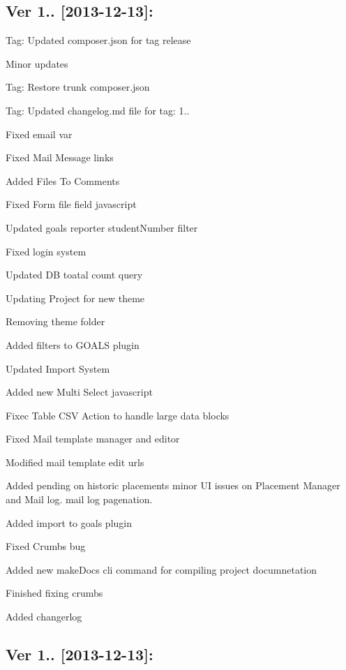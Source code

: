 \subsection*{Ver 1.. \mbox{[}2013-\/12-\/13\mbox{]}\+: }


\begin{DoxyItemize}
\item Tag\+: Updated composer.\+json for tag release
\item Minor updates
\item Tag\+: Restore trunk composer.\+json
\item Tag\+: Updated changelog.\+md file for tag\+: 1..
\item Fixed email var
\item Fixed Mail Message links
\item Added Files To Comments
\item Fixed Form file field javascript
\item Updated goals reporter student\+Number filter
\item Fixed login system
\item Updated D\+B toatal count query
\item Updating Project for new theme
\item Removing theme folder
\item Added filters to G\+O\+A\+L\+S plugin
\item Updated Import System
\item Added new Multi Select javascript
\item Fixec Table C\+S\+V Action to handle large data blocks
\item Fixed Mail template manager and editor
\item Modified mail template edit urls
\item Added pending on historic placements minor U\+I issues on Placement Manager and Mail log. mail log pagenation.
\item Added import to goals plugin
\item Fixed Crumbs bug
\item Added new make\+Docs cli command for compiling project documnetation
\item Finished fixing crumbs
\item Added changerlog
\end{DoxyItemize}

\subsection*{Ver 1.. \mbox{[}2013-\/12-\/13\mbox{]}\+: }



